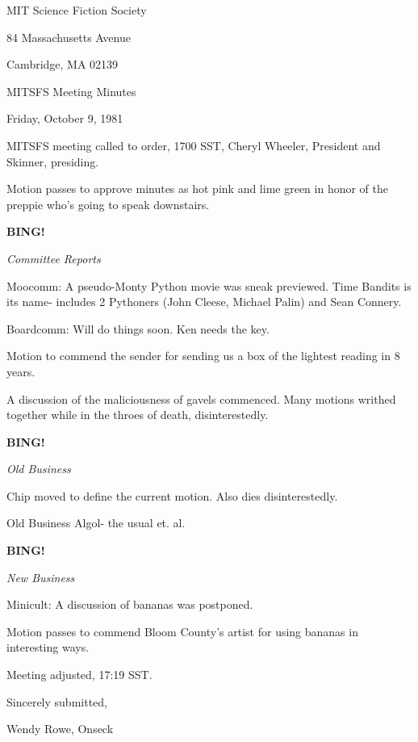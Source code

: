 \documentclass[12pt]{article}
\newcommand{\bing}{{\bf BING!} }
\newcommand{\goto}[1]{\bing \vskip 12pt \centerline{{\em{#1}}}}
\begin{document}
\begin{center}

MIT Science Fiction Society 

84 Massachusetts Avenue

Cambridge, MA 02139

\vspace{12pt}

MITSFS Meeting Minutes 

Friday, October 9, 1981

\end{center}
 
\vspace{18pt}

\setlength{\parskip}{6pt}

\noindent
MITSFS meeting called to order, 1700 SST,
Cheryl Wheeler, President and Skinner, presiding.

Motion passes to approve minutes as hot pink and lime green in honor of the preppie who's going to speak downstairs.

\goto{Committee Reports}

Moocomm: A pseudo-Monty Python movie was sneak previewed. Time Bandits is its name- includes 2 Pythoners (John Cleese, Michael Palin) and Sean Connery.

Boardcomm: Will do things soon. Ken needs the key.

Motion to commend the sender for sending us a box of the lightest reading in 8 years.

A discussion of the maliciousness of gavels commenced. Many motions writhed together while in the throes of death, disinterestedly.

\goto{Old Business}

Chip moved to define the current motion. Also dies disinterestedly.

Old Business Algol- the usual et. al.

\goto{New Business}

Minicult: A discussion of bananas was postponed.

Motion passes to commend Bloom County's artist for using bananas in interesting ways.

\vspace{12pt}

\noindent
Meeting adjusted, 17:19 SST.

\vspace{18pt}

\centerline{Sincerely submitted,}
\centerline{Wendy Rowe, Onseck}
\end{document}
